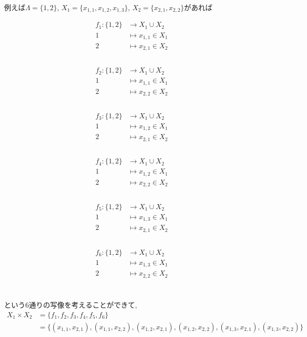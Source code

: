 \documentclass[a4j]{jsarticle}
\begin{document}
例えば$\Lambda=\{1,2\}$, $X_1=\{x_{1,1},x_{1,2},x_{1,3}\}$, $X_2=\{x_{2,1},x_{2,2}\}$があれば
\begin{multicols}{3}
	\begin{align*}
		f_1 : \{1,2\} & \rightarrow X_1 \cup X_2 \\
		1             & \mapsto x_{1,1} \in X_1  \\
		2             & \mapsto x_{2,1}\in X_2   \\
	\end{align*}\\
	\begin{align*}
		f_2 : \{1,2\} & \rightarrow X_1 \cup X_2 \\
		1             & \mapsto x_{1,1} \in X_1  \\
		2             & \mapsto x_{2,2}\in X_2   \\
	\end{align*}\\
	\begin{align*}
		f_3 : \{1,2\} & \rightarrow X_1 \cup X_2 \\
		1             & \mapsto x_{1,2} \in X_1  \\
		2             & \mapsto x_{2,1}\in X_2   \\
	\end{align*}\\
	\begin{align*}
		f_4 : \{1,2\} & \rightarrow X_1 \cup X_2 \\
		1             & \mapsto x_{1,2} \in X_1  \\
		2             & \mapsto x_{2,2}\in X_2   \\
	\end{align*}\\
	\begin{align*}
		f_5 : \{1,2\} & \rightarrow X_1 \cup X_2 \\
		1             & \mapsto x_{1,3} \in X_1  \\
		2             & \mapsto x_{2,1}\in X_2   \\
	\end{align*}\\
	\begin{align*}
		f_6 : \{1,2\} & \rightarrow X_1 \cup X_2 \\
		1             & \mapsto x_{1,3} \in X_1  \\
		2             & \mapsto x_{2,2}\in X_2   \\
	\end{align*}\\
\end{multicols}
という6通りの写像を考えることができて,
\begin{align*}
	X_1 \times X_2 & = \{f_1,f_2,f_3,f_4,f_5,f_6\}                                                                                     \\
	               & = \{(x_{1,1},x_{2,1}),(x_{1,1},x_{2,2}),(x_{1,2},x_{2,1}),(x_{1,2},x_{2,2}),(x_{1,3},x_{2,1}),(x_{1,3},x_{2,2})\}
\end{align*}\\
\end{document}
